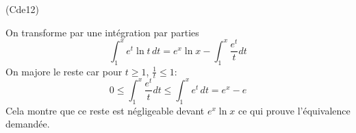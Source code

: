 \begin{tiny}(Cde12)\end{tiny} On transforme par une intégration par parties
\begin{displaymath}
 \int_1^xe^{t}\ln t\, dt = e^x\ln x-\int_1^x\frac{e^t}{t}dt 
\end{displaymath}
On majore le reste car pour $t\geq 1$, $\frac{1}{t}\leq 1$:
\begin{displaymath}
 0\leq \int_1^x\frac{e^t}{t}dt \leq \int_1^x e^t\,dt = e^x -e
\end{displaymath}
Cela montre que ce reste est négligeable devant $e^x\ln x$ ce qui prouve l'équivalence demandée.